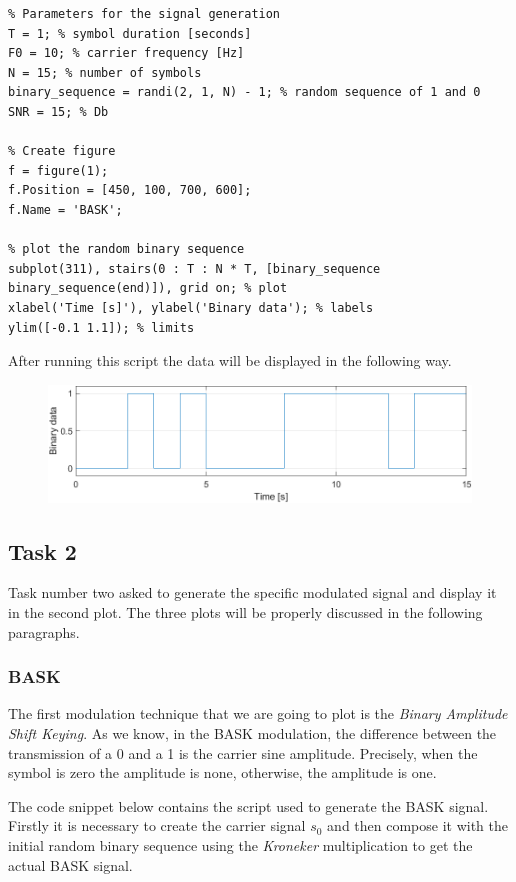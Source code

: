 \begin{lstlisting}
% Parameters for the signal generation 
T = 1; % symbol duration [seconds]
F0 = 10; % carrier frequency [Hz]
N = 15; % number of symbols
binary_sequence = randi(2, 1, N) - 1; % random sequence of 1 and 0
SNR = 15; % Db

% Create figure
f = figure(1);
f.Position = [450, 100, 700, 600];
f.Name = 'BASK';

% plot the random binary sequence
subplot(311), stairs(0 : T : N * T, [binary_sequence binary_sequence(end)]), grid on; % plot
xlabel('Time [s]'), ylabel('Binary data'); % labels
ylim([-0.1 1.1]); % limits
\end{lstlisting}

\noindent After running this script the data will be displayed in the following way.

\begin{figure}[!h]
    \centering
    \includegraphics[width = .7\textwidth]{lab-3/imgs/task1.png}
\end{figure}
\vspace*{-15px}


\subsection*{Task 2}
Task number two asked to generate the specific modulated signal and display it in the second plot. The three plots will be properly discussed in the following paragraphs.

\subsubsection*{BASK}
The first modulation technique that we are going to plot is the \textsl{Binary Amplitude Shift Keying}. As we know, in the BASK modulation, the difference between the transmission of a 0 and a 1 is the carrier sine amplitude. Precisely, when the symbol is zero the amplitude is none, otherwise, the amplitude is one.

The code snippet below contains the script used to generate the BASK signal. Firstly it is necessary to create the carrier signal $s_0$ and then compose it with the initial random binary sequence using the \textsl{Kroneker} multiplication to get the actual BASK signal.

